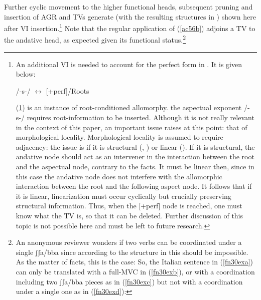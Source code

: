 \documentclass[output=paper]{langscibook}
\begin{document}
Further cyclic movement to the higher functional heads, subsequent pruning and insertion of AGR and TVs generate  (with the resulting structures in ) shown here after VI insertion.\footnote{An additional VI is needed to account for the perfect form in .  It is given below:

\ea \label{fn29ex} /-s-/ $\longleftrightarrow$ [+perf]/Roots \underline{\hspace{2em}}
\z

(\ref{fn29ex}) is an instance of root-conditioned allomorphy. the aspectual exponent /-s-/ requires root-information to be inserted. Although it is not really relevant in the context of this paper, an important issue raises at this point: that of morphological locality.  Morphological locality is assumed to require adjacency: the issue is if it is structural (\citealt{bobaljik2012a}, \citealt{calabrese2019a}) or linear (\citealt{embick2010a}).  If it is structural, the andative node should act as an intervener in the interaction between the root and the aspectual node, contrary to the facts. It must be linear then, since in this case the andative node does not interfere with the allomorphic interaction between the root and the following aspect node. It follows that if it is linear, linearization must occur cyclically but crucially preserving structural information. Thus, when the [+perf] node is reached, one must know what the TV is, so that it can be deleted. Further discussion of this topic is not possible here and must be left to future research.} Note that the regular application of (\ref{ac56b}) adjoins a TV to the andative head, as expected given its functional status.\footnote{An anonymous reviewer wonders if two verbs can be coordinated under a single ʃʃa/bba since according to the structure in  this should be impossible. As the matter of facts, this is the case: So, the Italian sentence in (\ref{fn30exa}) can only be translated with a full-MVC in (\ref{fn30exb}), or with a coordination including two ʃʃa/bba pieces as in (\ref{fn30exc}) but not with a coordination under a single one as in (\ref{fn30exd}):

}
\end{document}
